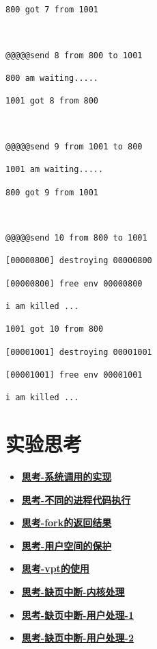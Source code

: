 \begin{verbatim}
800 got 7 from 1001



@@@@@send 8 from 800 to 1001

800 am waiting.....

1001 got 8 from 800



@@@@@send 9 from 1001 to 800

1001 am waiting.....

800 got 9 from 1001



@@@@@send 10 from 800 to 1001

[00000800] destroying 00000800

[00000800] free env 00000800

i am killed ...

1001 got 10 from 800

[00001001] destroying 00001001

[00001001] free env 00001001

i am killed ...

\end{verbatim}

\section{实验思考}

\begin{itemize}
	\item \hyperref[think-syscall]{\textbf{\textcolor{baseB}{思考-系统调用的实现}}}
	\item \hyperref[think-father-son]{\textbf{\textcolor{baseB}{思考-不同的进程代码执行}}}
	\item \hyperref[think-fork的调用]{\textbf{\textcolor{baseB}{思考-fork的返回结果}}}
	\item \hyperref[think:遍历页]{\textbf{\textcolor{baseB}{思考-用户空间的保护}}}
	\item \hyperref[think:vpt的使用]{\textbf{\textcolor{baseB}{思考-vpt的使用}}}
	\item \hyperref[think:pgfault-kernel]{\textbf{\textcolor{baseB}{思考-缺页中断-内核处理}}}
	\item \hyperref[think:pgfault-user-1]{\textbf{\textcolor{baseB}{思考-缺页中断-用户处理-1}}}
	\item \hyperref[think:pgfault-user-2]{\textbf{\textcolor{baseB}{思考-缺页中断-用户处理-2}}}
	
	
\end{itemize}


